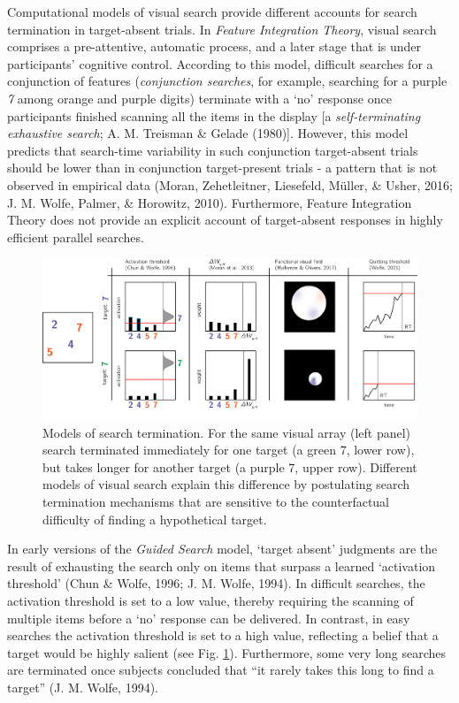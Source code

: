 \documentclass[12pt,twoside]{reedthesis}
\begin{document}
Computational models of visual search provide different accounts for search termination in target-absent trials. In \emph{Feature Integration Theory}, visual search comprises a pre-attentive, automatic process, and a later stage that is under participants' cognitive control. According to this model, difficult searches for a conjunction of features (\emph{conjunction searches}, for example, searching for a purple \emph{7} among orange and purple digits) terminate with a `no' response once participants finished scanning all the items in the display {[}a \emph{self-terminating exhaustive search}; A. M. Treisman \& Gelade (1980){]}. However, this model predicts that search-time variability in such conjunction target-absent trials should be lower than in conjunction target-present trials - a pattern that is not observed in empirical data (Moran, Zehetleitner, Liesefeld, Müller, \& Usher, 2016; J. M. Wolfe, Palmer, \& Horowitz, 2010). Furthermore, Feature Integration Theory does not provide an explicit account of target-absent responses in highly efficient parallel searches.
\begin{figure}
\includegraphics[width=1\linewidth]{figure/intro/termination_models_wide} \caption[Models of search termination]{Models of search termination. For the same visual array (left panel) search terminated immediately for one target (a green 7, lower row), but takes longer for another target (a purple 7, upper row). Different models of visual search explain this difference by postulating search termination mechanisms that are sensitive to the counterfactual difficulty of finding a hypothetical target.}\label{fig:intro-termination-models}
\end{figure}
In early versions of the \emph{Guided Search} model, `target absent' judgments are the result of exhausting the search only on items that surpass a learned `activation threshold' (Chun \& Wolfe, 1996; J. M. Wolfe, 1994). In difficult searches, the activation threshold is set to a low value, thereby requiring the scanning of multiple items before a `no' response can be delivered. In contrast, in easy searches the activation threshold is set to a high value, reflecting a belief that a target would be highly salient (see Fig. \ref{fig:intro-termination-models}). Furthermore, some very long searches are terminated once subjects concluded that ``it rarely takes this long to find a target'' (J. M. Wolfe, 1994).
\end{document}
